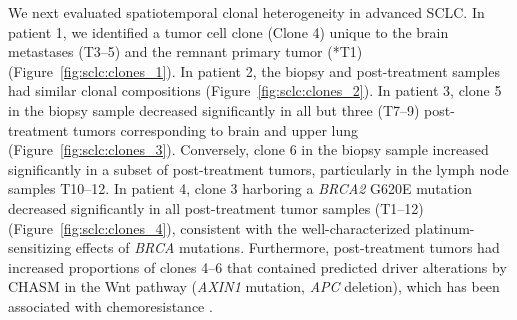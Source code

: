 We next evaluated spatiotemporal clonal heterogeneity in advanced SCLC\@. In patient 1, we identified a tumor cell clone (Clone 4) unique to the brain metastases (T3--5) and the remnant primary tumor (*T1) (Figure~\ref{fig:sclc:clones_1}). In patient 2, the biopsy and post-treatment samples had similar clonal compositions (Figure~\ref{fig:sclc:clones_2}). In patient 3, clone 5 in the biopsy sample decreased significantly in all but three (T7--9) post-treatment tumors corresponding to brain and upper lung (Figure~\ref{fig:sclc:clones_3}). Conversely, clone 6 in the biopsy sample increased significantly in a subset of post-treatment tumors, particularly in the lymph node samples T10--12. In patient 4, clone 3 harboring a \textit{BRCA2} G620E mutation decreased significantly in all post-treatment tumor samples (T1--12) (Figure~\ref{fig:sclc:clones_4}), consistent with the well-characterized platinum-sensitizing effects of \textit{BRCA} mutations. Furthermore, post-treatment tumors had increased proportions of clones 4--6 that contained predicted driver alterations by CHASM in the Wnt pathway (\textit{AXIN1} mutation, \textit{APC} deletion), which has been associated with chemoresistance \cite{wagner2018}.

